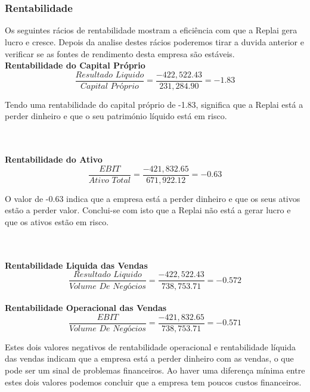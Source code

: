 \hrulefill
\\~\\
\newpage
\subsubsection{Rentabilidade}

Os seguintes rácios de rentabilidade mostram a eficiência com que a Replai gera lucro e cresce. Depois da analise destes rácios poderemos tirar a duvida anterior e verificar se as fontes de rendimento desta empresa são estáveis.\\

\textbf{Rentabilidade do Capital Próprio}\\

\[
    \frac{\textit{Resultado Liquido}}{\textit{Capital Próprio}} = \frac{-422,522.43}{231,284.90} = -1.83
\]

Tendo uma rentabilidade do capital próprio de -1.83, significa que a Replai está a perder dinheiro e que o seu património líquido está em risco.  

\hrulefill
\\~\\

\textbf{Rentabilidade do Ativo}\\

\[
    \frac{\textit{EBIT}}{\textit{Ativo Total}} = \frac{-421,832.65}{671,922.12} = -0.63
\]

O valor de -0.63 indica que a empresa está a perder dinheiro e que os seus ativos estão a perder valor. Conclui-se com isto que a Replai não está a gerar lucro e que os ativos estão em risco.

\hrulefill
\\~\\

\textbf{Rentabilidade Liquida das Vendas}\\

\[
    \frac{\textit{Resultado Liquido}}{\textit{Volume De Negócios}} = \frac{-422,522.43}{738,753.71} = -0.572
\]\\

\textbf{Rentabilidade Operacional das Vendas}\\

\[
    \frac{\textit{EBIT}}{\textit{Volume De Negócios}} = \frac{-421,832.65}{738,753.71} = -0.571
\]

Estes dois valores negativos de rentabilidade operacional e rentabilidade líquida das vendas indicam que a empresa está a perder dinheiro com as vendas, o que pode ser um sinal de problemas financeiros. Ao haver uma diferença mínima entre estes dois valores podemos concluir que a empresa tem poucos custos financeiros.


